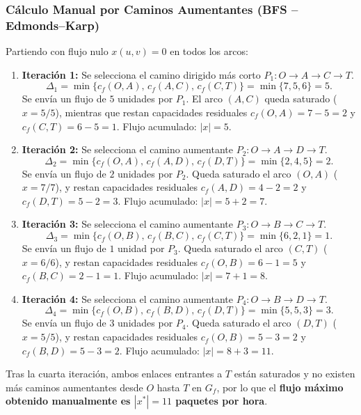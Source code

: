 \documentclass[11pt,a4paper]{article}
\begin{document}
\subsubsection{Cálculo Manual por Caminos Aumentantes (BFS -- Edmonds--Karp)}
Partiendo con flujo nulo $x(u,v) = 0$ en todos los arcos:
\begin{enumerate}
    \item \textbf{Iteración 1:} Se selecciona el camino dirigido más corto $P_1: O \to A \to C \to T$.
    \[
        \Delta_1 = \min\{c_f(O,A),\, c_f(A,C),\, c_f(C,T)\} = \min\{7, 5, 6\} = 5.
    \]
    Se envía un flujo de $5$ unidades por $P_1$. El arco $(A, C)$ queda saturado ($x = 5/5$), mientras que restan capacidades residuales $c_f(O, A) = 7 - 5 = 2$ y $c_f(C, T) = 6 - 5 = 1$. Flujo acumulado: $|x| = 5$.

    \item \textbf{Iteración 2:} Se selecciona el camino aumentante $P_2: O \to A \to D \to T$.
    \[
        \Delta_2 = \min\{c_f(O,A),\, c_f(A,D),\, c_f(D,T)\} = \min\{2, 4, 5\} = 2.
    \]
    Se envía un flujo de $2$ unidades por $P_2$. Queda saturado el arco $(O, A)$ ($x = 7/7$), y restan capacidades residuales $c_f(A, D) = 4 - 2 = 2$ y $c_f(D, T) = 5 - 2 = 3$. Flujo acumulado: $|x| = 5 + 2 = 7$.

    \item \textbf{Iteración 3:} Se selecciona el camino aumentante $P_3: O \to B \to C \to T$.
    \[
        \Delta_3 = \min\{c_f(O,B),\, c_f(B,C),\, c_f(C,T)\} = \min\{6, 2, 1\} = 1.
    \]
    Se envía un flujo de $1$ unidad por $P_3$. Queda saturado el arco $(C, T)$ ($x = 6/6$), y restan capacidades residuales $c_f(O, B) = 6 - 1 = 5$ y $c_f(B, C) = 2 - 1 = 1$. Flujo acumulado: $|x| = 7 + 1 = 8$.

    \item \textbf{Iteración 4:} Se selecciona el camino aumentante $P_4: O \to B \to D \to T$.
    \[
        \Delta_4 = \min\{c_f(O,B),\, c_f(B,D),\, c_f(D,T)\} = \min\{5, 5, 3\} = 3.
    \]
    Se envía un flujo de $3$ unidades por $P_4$. Queda saturado el arco $(D, T)$ ($x = 5/5$), y restan capacidades residuales $c_f(O, B) = 5 - 3 = 2$ y $c_f(B, D) = 5 - 3 = 2$. Flujo acumulado: $|x| = 8 + 3 = 11$.
\end{enumerate}

Tras la cuarta iteración, ambos enlaces entrantes a $T$ están saturados y no existen más caminos aumentantes desde $O$ hasta $T$ en $G_f$, por lo que el \textbf{flujo máximo obtenido manualmente es $|x^*| = 11$ paquetes por hora}.
\end{document}
